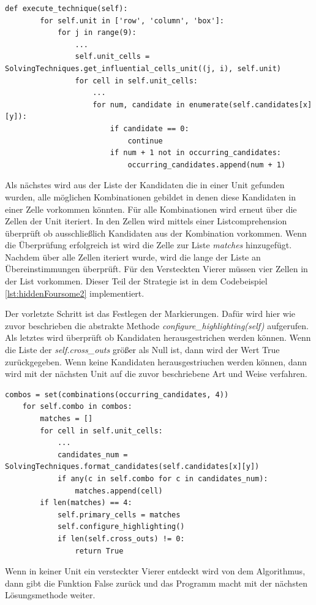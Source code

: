 \begin{lstlisting}[caption={Erster Teil der Strategie Versteckter Vierer}, label={lst:hiddenFoursome1}]
	def execute_technique(self):
		for self.unit in ['row', 'column', 'box']:
			for j in range(9):
				...
				self.unit_cells = SolvingTechniques.get_influential_cells_unit((j, i), self.unit)
				for cell in self.unit_cells:
					...
					for num, candidate in enumerate(self.candidates[x][y]):
						if candidate == 0:
							continue
						if num + 1 not in occurring_candidates:
							occurring_candidates.append(num + 1)
\end{lstlisting}


Als nächstes wird aus der Liste der Kandidaten die in einer Unit gefunden wurden, alle möglichen Kombinationen gebildet in denen diese Kandidaten in einer Zelle vorkommen könnten. Für alle Kombinationen wird erneut über die Zellen der Unit iteriert. In den Zellen wird mittels einer Listcomprehension überprüft ob ausschließlich Kandidaten aus der Kombination vorkommen. Wenn die Überprüfung erfolgreich ist wird die Zelle zur Liste \textit{matches} hinzugefügt. Nachdem über alle Zellen iteriert wurde, wird die lange der Liste an Übereinstimmungen überprüft. Für den Versteckten Vierer müssen vier Zellen in der List vorkommen. Dieser Teil der Strategie ist in dem Codebeispiel \ref{lst:hiddenFoursome2} implementiert.

Der vorletzte Schritt ist das Festlegen der Markierungen. Dafür wird hier wie zuvor beschrieben die abstrakte Methode \textit{configure\_highlighting(self)} aufgerufen. Als letztes wird überprüft ob Kandidaten herausgestrichen werden können. Wenn die Liste der \textit{self.cross\_outs} größer als Null ist, dann wird der Wert True zurückgegeben. Wenn keine Kandidaten herausgestriuchen werden können, dann wird mit der nächsten Unit auf die zuvor beschriebene Art und Weise verfahren.

\begin{lstlisting}[caption={Erster Teil der Strategie Versteckter Vierer}, label={lst:hiddenFoursome2}]
	combos = set(combinations(occurring_candidates, 4))
	for self.combo in combos:
		matches = []
		for cell in self.unit_cells:
			...
			candidates_num = SolvingTechniques.format_candidates(self.candidates[x][y])
			if any(c in self.combo for c in candidates_num):
				matches.append(cell)
		if len(matches) == 4:
			self.primary_cells = matches
			self.configure_highlighting()
			if len(self.cross_outs) != 0:
				return True
\end{lstlisting}

Wenn in keiner Unit ein versteckter Vierer entdeckt wird von dem Algorithmus, dann gibt die Funktion False zurück und das Programm macht mit der nächsten Lösungsmethode weiter.
